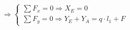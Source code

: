 \documentclass[preview]{standalone}
\begin{document}
\begin{align*}
{{\Longrightarrow \left\{\begin{array}{lc}\sum F_x = 0 \Longrightarrow X_E = 0 \\ \sum F_y = 0 \Longrightarrow Y_E + Y_A = q\cdot l_1 + F \end{array}\right. }}
\end{align*}
\end{document}
